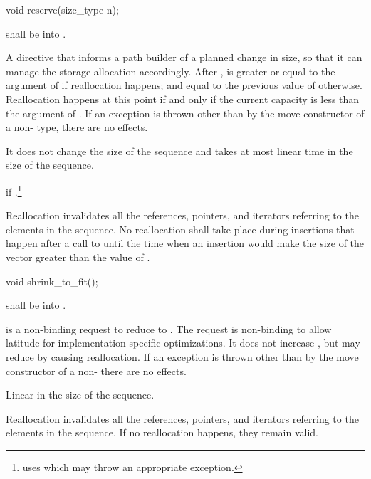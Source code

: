 \begin{itemdecl}
void reserve(size_type n);
\end{itemdecl}
\begin{itemdescr}
\pnum
\requires
{} shall be  into .

\pnum
\effects
A directive that informs a path builder of a planned change in size, so that it can manage the storage
allocation accordingly. After ,  is greater or equal to the argument of  if
reallocation happens; and equal to the previous value of  otherwise. Reallocation happens
at this point if and only if the current capacity is less than the argument of . If an exception
is thrown other than by the move constructor of a non- type, there are no effects.

\pnum
\complexity
It does not change the size of the sequence and takes at most linear time in the size of the
sequence.

\pnum
\throws
{} if .\footnote{ uses  which
may throw an appropriate exception.}

\pnum
\remarks
Reallocation invalidates all the references, pointers, and iterators
referring to the elements in the sequence.
No reallocation shall take place during insertions that happen
after a call to
until the time when an insertion would make the size of the vector
greater than the value of
.
\end{itemdescr}

\begin{itemdecl}
void shrink_to_fit();
\end{itemdecl}
\begin{itemdescr}
\pnum
\requires
{} shall be  into .

\pnum
\effects
{} is a non-binding request to reduce
 to .
\enternote
The request is non-binding to allow latitude for
implementation-specific optimizations.
\exitnote
It does not increase , but may reduce 
by causing reallocation. 
If an exception is thrown other than by the move constructor
of a non-  there are no effects.

\pnum
\complexity Linear in the size of the sequence.

\pnum
\remarks Reallocation invalidates all the references, pointers, and 
iterators referring to the elements in the sequence. If no reallocation 
happens, they remain valid.
\end{itemdescr}

